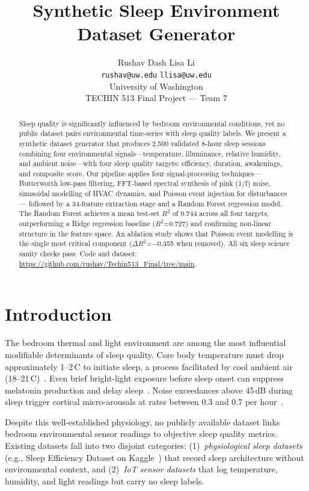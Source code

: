 \documentclass[11pt,a4paper,twocolumn]{article}
\title{\textbf{\Large Synthetic Sleep Environment Dataset Generator}}
\author{
  Rushav Dash \quad Lisa Li \\
  \texttt{rushav@uw.edu} \quad \texttt{llisa@uw.edu} \\
  University of Washington \\
  TECHIN 513 Final Project --- Team 7
}
\date{}
\begin{document}
\maketitle
\thispagestyle{empty}

\begin{abstract}
\small
Sleep quality is significantly influenced by bedroom environmental conditions,
yet no public dataset pairs environmental time-series with sleep quality labels.
We present a synthetic dataset generator that produces 2,500 validated 8-hour
sleep sessions combining four environmental signals---temperature, illuminance,
relative humidity, and ambient noise---with four sleep quality targets:
efficiency, duration, awakenings, and composite score.
Our pipeline applies four signal-processing techniques---Butterworth low-pass
filtering, FFT-based spectral synthesis of pink (1/f) noise, sinusoidal
modelling of HVAC dynamics, and Poisson event injection for disturbances---
followed by a 34-feature extraction stage and a Random Forest regression model.
The Random Forest achieves a mean test-set $R^2$ of 0.744 across all four
targets, outperforming a Ridge regression baseline ($R^2$=0.727) and
confirming non-linear structure in the feature space.
An ablation study shows that Poisson event modelling is the single most critical
component ($\Delta R^2$=$-$0.355 when removed).
All six sleep science sanity checks pass.
Code and dataset: \url{https://github.com/rushav/Techin513_Final/tree/main}.
\end{abstract}

\section{Introduction}

The bedroom thermal and light environment are among the most influential
modifiable determinants of sleep quality.
Core body temperature must drop approximately 1--2\,\textdegree C to initiate
sleep, a process facilitated by cool ambient air (18--21\,\textdegree C)~\citep{okamoto2012}.
Even brief bright-light exposure before sleep onset can suppress melatonin
production and delay sleep~\citep{gooley2011}.
Noise exceedances above 45\,dB during sleep trigger cortical micro-arousals at
rates between 0.3 and 0.7 per hour~\citep{hume2012}.

Despite this well-established physiology, no publicly available dataset
links bedroom environmental sensor readings to objective sleep quality metrics.
Existing datasets fall into two disjoint categories:
(1)~\textit{physiological sleep datasets} (e.g., Sleep Efficiency Dataset on
Kaggle~\citep{kaggle2023}) that record sleep architecture without environmental
context, and
(2)~\textit{IoT sensor datasets} that log temperature, humidity, and light
readings but carry no sleep labels.
\end{document}
